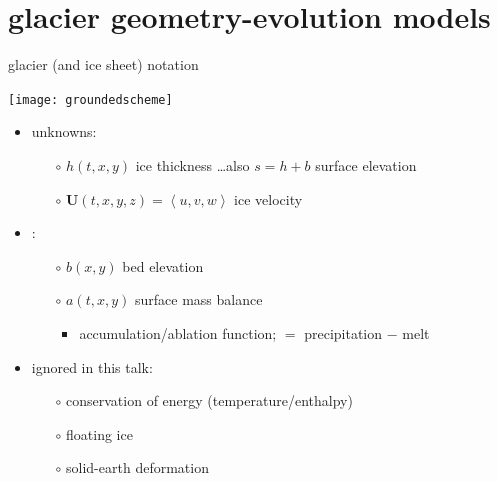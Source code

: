 \documentclass[xcolor={dvipsnames}]{beamer}
\newcommand\bU{\mathbf{U}}
\begin{document}

\section{glacier geometry-evolution models}

\begin{frame}{glacier (and ice sheet) notation}

\begin{center}
\texttt{[image: groundedscheme]}
\end{center}

\begin{itemize}
\item unknowns:
  \begin{itemize}
  \item[$\circ$]  $h(t,x,y)$ ice thickness \hfill \dots also $s=h+b$ surface elevation
  \item[$\circ$]  $\bU(t,x,y,z) = \left<u,v,w\right>$ ice velocity
  \end{itemize}
\item {}:
  \begin{itemize}
  \item[$\circ$]  $b(x,y)$ bed elevation 
  \item[$\circ$]  $a(t,x,y)$ surface mass balance  
    \begin{itemize}
    \item accumulation/ablation function; $=$ precipitation $-$ melt
    \end{itemize}
  \end{itemize}
\item ignored in this talk:
  \begin{itemize}
  \item[$\circ$]  conservation of energy (temperature/enthalpy)
  \item[$\circ$]  floating ice
  \item[$\circ$]  solid-earth deformation
  \end{itemize}
\end{itemize}
\end{frame}
\end{document}
